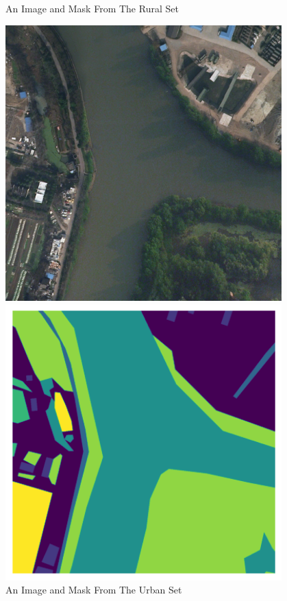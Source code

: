 \begin{figure}[!htb]
\begin{minipage}{0.5\textwidth}
    \end{minipage}
\caption{An Image and Mask From The Rural Set \protect\cite{loveda}}
\label{fig:6}
\end{figure}
\FloatBarrier

\FloatBarrier
\begin{figure}[!htb]
    \centering
    \begin{minipage}{0.5\textwidth}
        \centering
        \includegraphics[width=0.95\textwidth, height=0.35\textheight]{images/1564.png}
    \end{minipage}\hfill
    \begin{minipage}{0.5\textwidth}
        \centering
        \includegraphics[width=0.95\textwidth, height=0.35\textheight]{images/mask-urban-1564.png}
    \end{minipage}
\caption{An Image and Mask From The Urban Set \protect\cite{loveda}}
\label{fig:1564}
\end{figure}
